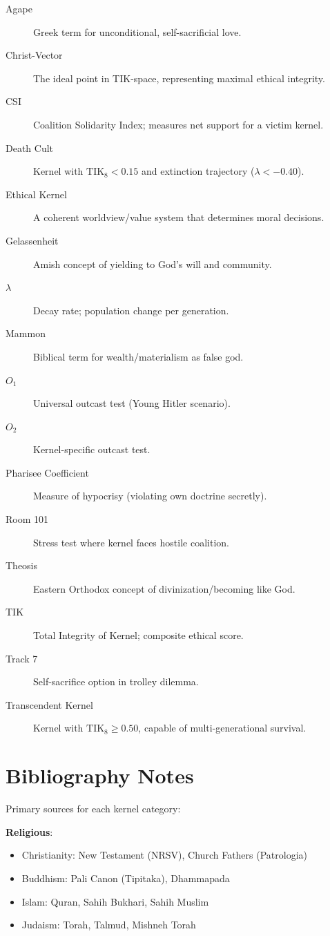\documentclass[11pt,a4paper]{article}
\theoremstyle{definition}
\theoremstyle{remark}
\newcommand{\TIKeight}{\text{TIK}_8}
\begin{document}
\begin{description}
    \item[Agape] Greek term for unconditional, self-sacrificial love.
    \item[Christ-Vector] The ideal point in TIK-space, representing maximal ethical integrity.
    \item[CSI] Coalition Solidarity Index; measures net support for a victim kernel.
    \item[Death Cult] Kernel with $\TIKeight < 0.15$ and extinction trajectory ($\lambda < -0.40$).
    \item[Ethical Kernel] A coherent worldview/value system that determines moral decisions.
    \item[Gelassenheit] Amish concept of yielding to God's will and community.
    \item[$\lambda$] Decay rate; population change per generation.
    \item[Mammon] Biblical term for wealth/materialism as false god.
    \item[$O_1$] Universal outcast test (Young Hitler scenario).
    \item[$O_2$] Kernel-specific outcast test.
    \item[Pharisee Coefficient] Measure of hypocrisy (violating own doctrine secretly).
    \item[Room 101] Stress test where kernel faces hostile coalition.
    \item[Theosis] Eastern Orthodox concept of divinization/becoming like God.
    \item[TIK] Total Integrity of Kernel; composite ethical score.
    \item[Track 7] Self-sacrifice option in trolley dilemma.
    \item[Transcendent Kernel] Kernel with $\TIKeight \geq 0.50$, capable of multi-generational survival.
\end{description}

\section{Bibliography Notes}
\label{app:bibliography}

Primary sources for each kernel category:

\textbf{Religious}:
\begin{itemize}
    \item Christianity: New Testament (NRSV), Church Fathers (Patrologia)
    \item Buddhism: Pali Canon (Tipitaka), Dhammapada
    \item Islam: Quran, Sahih Bukhari, Sahih Muslim
    \item Judaism: Torah, Talmud, Mishneh Torah
\end{itemize}
\end{document}
